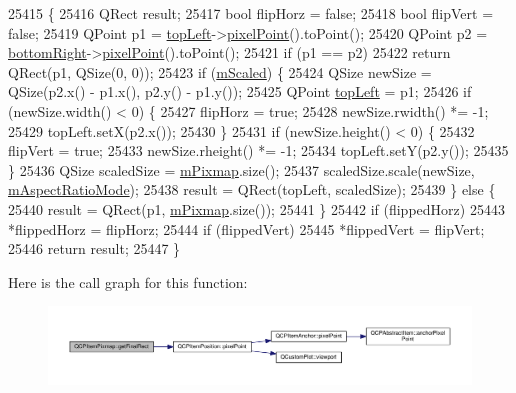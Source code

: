 \begin{DoxyCode}
25415                                                                             \{
25416   QRect result;
25417   \textcolor{keywordtype}{bool} flipHorz = \textcolor{keyword}{false};
25418   \textcolor{keywordtype}{bool} flipVert = \textcolor{keyword}{false};
25419   QPoint p1 = \hyperlink{class_q_c_p_item_pixmap_a43c281ef6ad46f3cf04f365289abe51a}{topLeft}->\hyperlink{class_q_c_p_item_position_ae490f9c76ee2ba33752c495d3b6e8fb5}{pixelPoint}().toPoint();
25420   QPoint p2 = \hyperlink{class_q_c_p_item_pixmap_abcc38063f9502b876bf6615c45cc0994}{bottomRight}->\hyperlink{class_q_c_p_item_position_ae490f9c76ee2ba33752c495d3b6e8fb5}{pixelPoint}().toPoint();
25421   \textcolor{keywordflow}{if} (p1 == p2)
25422     \textcolor{keywordflow}{return} QRect(p1, QSize(0, 0));
25423   \textcolor{keywordflow}{if} (\hyperlink{class_q_c_p_item_pixmap_a8fe670a529cd46a9b8afd9fc1203bc3f}{mScaled}) \{
25424     QSize newSize = QSize(p2.x() - p1.x(), p2.y() - p1.y());
25425     QPoint \hyperlink{class_q_c_p_item_pixmap_a43c281ef6ad46f3cf04f365289abe51a}{topLeft} = p1;
25426     \textcolor{keywordflow}{if} (newSize.width() < 0) \{
25427       flipHorz = \textcolor{keyword}{true};
25428       newSize.rwidth() *= -1;
25429       topLeft.setX(p2.x());
25430     \}
25431     \textcolor{keywordflow}{if} (newSize.height() < 0) \{
25432       flipVert = \textcolor{keyword}{true};
25433       newSize.rheight() *= -1;
25434       topLeft.setY(p2.y());
25435     \}
25436     QSize scaledSize = \hyperlink{class_q_c_p_item_pixmap_a1396cce7f26c7b8e9512906284380c4d}{mPixmap}.size();
25437     scaledSize.scale(newSize, \hyperlink{class_q_c_p_item_pixmap_a8dc6b6c1e106ac523efae22d5fe55bab}{mAspectRatioMode});
25438     result = QRect(topLeft, scaledSize);
25439   \} \textcolor{keywordflow}{else} \{
25440     result = QRect(p1, \hyperlink{class_q_c_p_item_pixmap_a1396cce7f26c7b8e9512906284380c4d}{mPixmap}.size());
25441   \}
25442   \textcolor{keywordflow}{if} (flippedHorz)
25443     *flippedHorz = flipHorz;
25444   \textcolor{keywordflow}{if} (flippedVert)
25445     *flippedVert = flipVert;
25446   \textcolor{keywordflow}{return} result;
25447 \}
\end{DoxyCode}


Here is the call graph for this function\+:\nopagebreak
\begin{figure}[H]
\begin{center}
\leavevmode
\includegraphics[width=350pt]{class_q_c_p_item_pixmap_a245ef0c626cab7096a810442f2f6a2d9_cgraph}
\end{center}
\end{figure}




